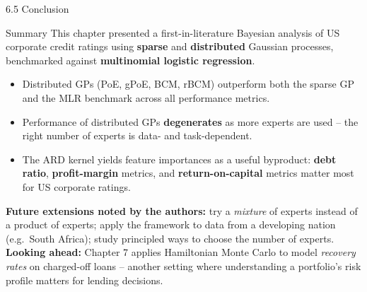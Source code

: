 \documentclass[aspectratio=169,10pt]{beamer}
\begin{document}
\begin{frame}{6.5 Conclusion}
  \begin{block}{Summary}
    This chapter presented a first-in-literature Bayesian analysis of US
    corporate credit ratings using \textbf{sparse} and \textbf{distributed}
    Gaussian processes, benchmarked against \textbf{multinomial logistic
    regression}.
  \end{block}
  \begin{itemize}
    \item Distributed GPs (PoE, gPoE, BCM, rBCM) outperform both the sparse
          GP and the MLR benchmark across all performance metrics.
    \item Performance of distributed GPs \textbf{degenerates} as more
          experts are used -- the right number of experts is data- and
          task-dependent.
    \item The ARD kernel yields feature importances as a useful byproduct:
          \textbf{debt ratio}, \textbf{profit-margin} metrics, and
          \textbf{return-on-capital} metrics matter most for US corporate
          ratings.
  \end{itemize}
  \textbf{Future extensions noted by the authors:} try a \emph{mixture} of
  experts instead of a product of experts; apply the framework to data from
  a developing nation (e.g.\ South Africa); study principled ways to choose
  the number of experts.
  \vspace{0.2em}\\
  \textbf{Looking ahead:} Chapter 7 applies Hamiltonian Monte Carlo to model
  \emph{recovery rates} on charged-off loans -- another setting where
  understanding a portfolio's risk profile matters for lending decisions.
\end{frame}
\end{document}
